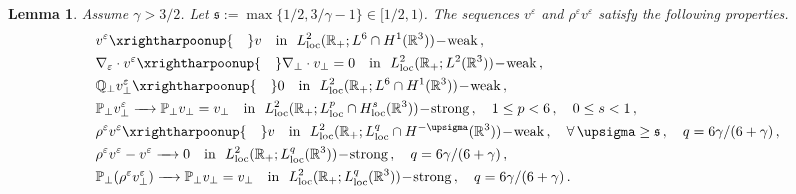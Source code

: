 \documentclass[11pt,reqno]{amsart}
\newtheorem{lemma}{Lemma}
\def \R{{\mathbb{R}}}
\def \Q{{\mathbb{Q}}}
\def \P{{\mathbb{P}}}
\begin{document}
\begin{lemma}
  \label{lem:cv-vperp-R} Assume $\gamma > 3/2$. Let $\mathfrak s:=\max\{1/2,3/\gamma-1\} \in [1/2,1)$. The sequences ${v^\varepsilon}$ and $\rho^\varepsilon v^\varepsilon $ satisfy the following properties.
  \begin{align*}
    & v^\varepsilon \xrightharpoonup{\quad} v \ \ \mbox{ \rm in } \  L_{\rm loc}^2(\R_+; L^6\cap H^1(\R^3))\!-\!\mbox{\rm weak}\,,\\
    & \nabla_\varepsilon \cdot v^\varepsilon   \xrightharpoonup{\quad}\nabla_\perp \cdot v_\perp =0 \ \ \mbox{ \rm in } \  L_{\rm loc}^2(\R_+; L^2(\R^3))\!-\!\mbox{\rm weak}\,,\\
    & \Q_\perp v_\perp^\varepsilon \xrightharpoonup{\quad} 0 \ \ \mbox{ \rm in } \  L_{\rm loc}^2(\R_+; L^6\cap H^{1}(\R^3))\!-\!\mbox{\rm weak}\,, \\
    & \P_\perp v_\perp^\varepsilon \xrightarrow{\quad} \P_\perp v_\perp=  v_\perp \ \ \mbox{ \rm in } \  L_{\rm loc}^2(\R_+; L_{\rm loc}^p\cap H_{\rm loc}^{s}(\R^3))\!-\!\mbox{\rm strong}\,, \quad 1\leq p <6\,, \quad 0\leq s <1\,, \\
    & \rho^\varepsilon v^\varepsilon  \xrightharpoonup {\quad} v
    \ \ \mbox{ \rm in } \  L_{\rm loc}^2(\R_+; L_{\rm loc}^q \cap H^{-\upsigma}(\R^3))\!-\!\mbox{\rm weak}\,, \quad \forall\, \upsigma \geq \mathfrak s\,, \quad  q={6\gamma}/({6+\gamma})\,,\\
    & \rho^\varepsilon v^\varepsilon-v^\varepsilon  \xrightarrow{\quad} 0
    \ \ \mbox{ \rm in } \  L_{\rm loc}^2(\R_+; L_{\rm loc}^q(\R^3))\!-\!\mbox{\rm strong}\,, \quad   q={6\gamma}/({6+\gamma})\,, \\
    & \P_\perp (\rho^\varepsilon v_\perp^\varepsilon)  \xrightarrow{\quad} \P_\perp v_\perp=  v_\perp
    \ \ \mbox{ \rm in } \  L_{\rm loc}^2(\R_+; L_{\rm loc}^q(\R^3))\!-\!\mbox{\rm strong}\,, \quad   q={6\gamma}/({6+\gamma})\,.
  \end{align*}
\end{lemma}
\end{document}
